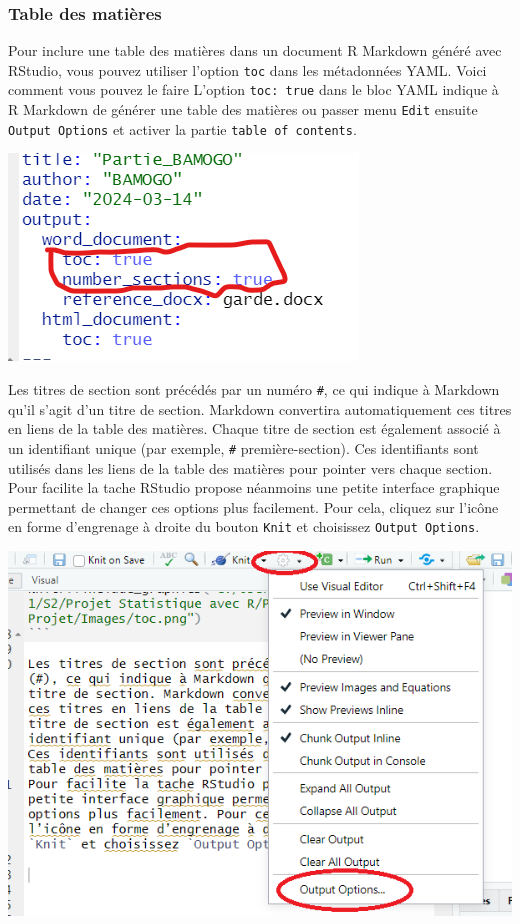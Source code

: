 \documentclass[
  12pt,
]{article}
\begin{document}
\subsubsection{Table des matières}\label{table-des-matiuxe8res}

Pour inclure une table des matières dans un document R Markdown généré
avec RStudio, vous pouvez utiliser l'option \texttt{toc} dans les
métadonnées YAML. Voici comment vous pouvez le faire L'option
\texttt{toc:\ true} dans le bloc YAML indique à R Markdown de générer
une table des matières ou passer menu \texttt{Edit} ensuite
\texttt{Output\ Options} et activer la partie
\texttt{table\ of\ contents}.

\begin{center}\includegraphics[width=0.5\linewidth,height=0.5\textheight]{../Document_Rmarkdown/Images/toc} \end{center}

Les titres de section sont précédés par un numéro \texttt{\#}, ce qui
indique à Markdown qu'il s'agit d'un titre de section. Markdown
convertira automatiquement ces titres en liens de la table des matières.
Chaque titre de section est également associé à un identifiant unique
(par exemple, \texttt{\#} première-section). Ces identifiants sont
utilisés dans les liens de la table des matières pour pointer vers
chaque section. Pour facilite la tache RStudio propose néanmoins une
petite interface graphique permettant de changer ces options plus
facilement. Pour cela, cliquez sur l'icône en forme d'engrenage à droite
du bouton \texttt{Knit} et choisissez \texttt{Output\ Options}.

\begin{center}\includegraphics[width=0.5\linewidth,height=0.5\textheight]{../Document_Rmarkdown/Images/Output_option} \end{center}
\end{document}
